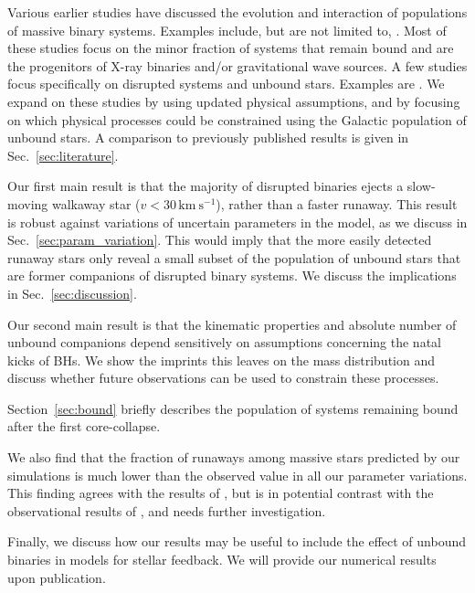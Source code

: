 \documentclass{aa}
\newcommand{\todo}[1]{{\large $\blacksquare$~\textbf{\color{red}[#1]}}~$\blacksquare$}
\DeclareRobustCommand{\Secref}[1]{Sec.~\ref{#1}}
\begin{document}
Various earlier studies have discussed the evolution and
interaction of populations of massive binary systems. Examples
include, but are not limited to, \citet[][]{vanbeveren:82, dedonder:97, Fryer+1997, Fryer+2001, fryer:12,
  Belczynski+2012b, repetto:12, Fragos+2013a, Grudzinska+2015,
  bray:18, boubert:18}. Most
of these studies focus on the minor fraction of systems
that remain bound and are the progenitors of X-ray binaries and/or
gravitational wave sources. A few studies focus specifically on
disrupted systems and unbound stars. Examples are
\cite{vanrensbergen:96,dedonder:97, dray:05, eldridge:11, bray:16, boubert:17b,
  zapartas:17b, boubert:18}. We expand on these studies by using updated physical
assumptions, and by focusing on which physical processes could be
constrained using the Galactic population of unbound stars. A
comparison to previously published results is given in \Secref{sec:literature}. 

Our first main result is that the majority of disrupted binaries
ejects a slow-moving walkaway star ($v < 30\,\mathrm{km\ s^{-1}}$), rather than a faster runaway. This result is robust against
variations of uncertain parameters in the model, as we discuss in \Secref{sec:param_variation}.
This would imply that the more easily detected runaway stars only
reveal a small subset of the population of unbound stars that are
former companions of disrupted binary systems.  We discuss the implications in \Secref{sec:discussion}.

Our second main result is that the kinematic properties and absolute
number of unbound companions depend sensitively on assumptions
concerning the  natal kicks of BHs. We show the imprints this leaves on
the mass distribution and discuss whether future observations can be
used to constrain these processes.

Section~\ref{sec:bound} briefly describes the population of systems remaining bound after the first
core-collapse.

We also find that the fraction of runaways among massive stars
predicted by our simulations is much lower than the observed value in
all our parameter variations. This finding agrees with the results of
\cite{eldridge:11}, but is in potential contrast
with the observational results of \cite{hoogerwerf:01}, and needs further
investigation.

Finally, we discuss how our results  may be useful to
include the effect of unbound binaries in models for stellar
feedback. We will provide our numerical results upon publication. %
\end{document}
